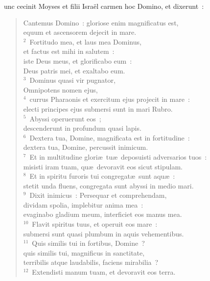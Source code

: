 \bchapter
{}unc cecinit Moyses et filii Isra\"el carmen hoc Domino, et dixerunt~: \begin{verse}\vspace{6pt}Cantemus Domino~: gloriose enim magnificatus est,\\ equum et ascensorem dejecit in mare.\\
${}^{2}$~Fortitudo mea, et laus mea Dominus,\\ et factus est mihi in salutem~:\\ iste Deus meus, et glorificabo eum~:\\ Deus patris mei, et exaltabo eum.\\
${}^{3}$~Dominus quasi vir pugnator,\\ Omnipotens nomen ejus,\\
${}^{4}$~currus Pharaonis et exercitum ejus projecit in mare~:\\ electi principes ejus submersi sunt in mari Rubro.\\
${}^{5}$~Abyssi operuerunt eos~;\\ descenderunt in profundum quasi lapis.\\
${}^{6}$~Dextera tua, Domine, magnificata est in fortitudine~:\\ dextera tua, Domine, percussit inimicum.\\
${}^{7}$~Et in multitudine glori\ae\ tu\ae\ deposuisti adversarios tuos~:\\ misisti iram tuam, qu\ae\ devoravit eos sicut stipulam.\\
${}^{8}$~Et in spiritu furoris tui congregat\ae\ sunt aqu\ae~:\\ stetit unda fluens, congregata sunt abyssi in medio mari.\\
${}^{9}$~Dixit inimicus~: Persequar et comprehendam,\\ dividam spolia, implebitur anima mea~:\\ evaginabo gladium meum, interficiet eos manus mea.\\
${}^{10}$~Flavit spiritus tuus, et operuit eos mare~:\\ submersi sunt quasi plumbum in aquis vehementibus.\\
${}^{11}$~Quis similis tui in fortibus, Domine~?\\ quis similis tui, magnificus in sanctitate,\\ terribilis atque laudabilis, faciens mirabilia~?\\
${}^{12}$~Extendisti manum tuam, et devoravit eos terra.\\

\end{verse}
